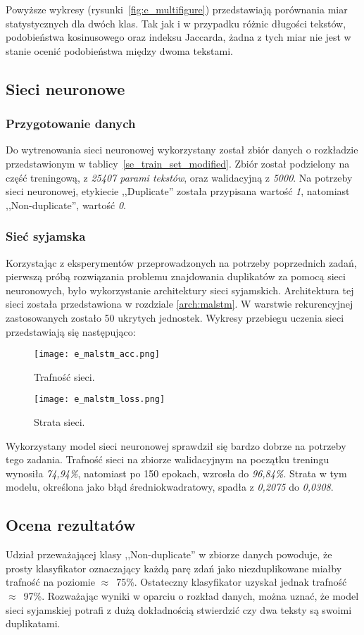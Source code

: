 Powyższe wykresy (rysunki~\ref{fig:e_multifigure}) przedstawiają porównania miar statystycznych dla dwóch klas. Tak jak i w przypadku różnic długości tekstów, podobieństwa kosinusowego oraz indeksu Jaccarda, żadna z tych miar nie jest w stanie ocenić podobieństwa między dwoma tekstami.

\subsection{Sieci neuronowe}
\subsubsection{Przygotowanie danych}
Do wytrenowania sieci neuronowej wykorzystany został zbiór danych o rozkładzie przedstawionym w tablicy~\ref{se_train_set_modified}. Zbiór został podzielony na część treningową, z \emph{25407 parami tekstów}, oraz walidacyjną z \emph{5000}. Na potrzeby sieci neuronowej, etykiecie ,,Duplicate'' została przypisana wartość \emph{1}, natomiast ,,Non-duplicate'', wartość \emph{0}.

\subsubsection{Sieć syjamska}
Korzystając z eksperymentów przeprowadzonych na potrzeby poprzednich zadań, pierwszą próbą rozwiązania problemu znajdowania duplikatów za pomocą sieci neuronowych, było wykorzystanie architektury sieci syjamskich.
Architektura tej sieci została przedstawiona w rozdziale \ref{arch:malstm}. W warstwie rekurencyjnej zastosowanych zostało 50 ukrytych jednostek. Wykresy przebiegu uczenia sieci przedstawiają się następująco:

\begin{figure}[H]
\centering
\texttt{[image: e\_malstm\_acc.png]}
\caption{Trafność sieci.}
\label{fig:e_malstm_acc}
\end{figure}

\begin{figure}[H]
\centering
\texttt{[image: e\_malstm\_loss.png]}
\caption{Strata sieci.}
\label{fig:e_malstm_loss}
\end{figure}

Wykorzystany model sieci neuronowej sprawdził się bardzo dobrze na potrzeby tego zadania. Trafność sieci na zbiorze walidacyjnym na początku treningu wynosiła \emph{74,94\%}, natomiast po 150 epokach, wzrosła do \emph{96,84\%}. Strata w tym modelu, określona jako błąd średniokwadratowy, spadła z \emph{0,2075} do \emph{0,0308}.

\subsection{Ocena rezultatów}

Udział przeważającej klasy ,,Non-duplicate'' w zbiorze danych powoduje, że prosty klasyfikator oznaczający każdą parę zdań jako niezduplikowane miałby trafność na poziomie $\approx$~75\%. Ostateczny klasyfikator uzyskał jednak trafność $\approx$~97\%. Rozważając wyniki w oparciu o rozkład danych, można uznać, że model sieci syjamskiej potrafi z dużą dokładnością stwierdzić czy dwa teksty są swoimi duplikatami.
